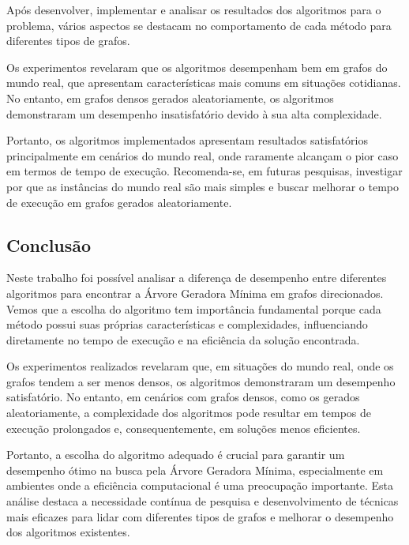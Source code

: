 Após desenvolver, implementar e analisar os resultados dos algoritmos para o problema, vários aspectos se destacam no comportamento de cada método para diferentes tipos de grafos.

Os experimentos revelaram que os algoritmos desempenham bem em grafos do mundo real, que apresentam características mais comuns em situações cotidianas. No entanto, em grafos densos gerados aleatoriamente, os algoritmos demonstraram um desempenho insatisfatório devido à sua alta complexidade.

Portanto, os algoritmos implementados apresentam resultados satisfatórios principalmente em cenários do mundo real, onde raramente alcançam o pior caso em termos de tempo de execução. Recomenda-se, em futuras pesquisas, investigar por que as instâncias do mundo real são mais simples e buscar melhorar o tempo de execução em grafos gerados aleatoriamente.

\subsection{\esp Conclusão}
Neste trabalho foi possível analisar a diferença de desempenho entre diferentes algoritmos para encontrar a Árvore Geradora Mínima em grafos direcionados. Vemos que a escolha do algoritmo tem importância fundamental porque cada método possui suas próprias características e complexidades, influenciando diretamente no tempo de execução e na eficiência da solução encontrada.

Os experimentos realizados revelaram que, em situações do mundo real, onde os grafos tendem a ser menos densos, os algoritmos demonstraram um desempenho satisfatório. No entanto, em cenários com grafos densos, como os gerados aleatoriamente, a complexidade dos algoritmos pode resultar em tempos de execução prolongados e, consequentemente, em soluções menos eficientes.

Portanto, a escolha do algoritmo adequado é crucial para garantir um desempenho ótimo na busca pela Árvore Geradora Mínima, especialmente em ambientes onde a eficiência computacional é uma preocupação importante. Esta análise destaca a necessidade contínua de pesquisa e desenvolvimento de técnicas mais eficazes para lidar com diferentes tipos de grafos e melhorar o desempenho dos algoritmos existentes.

% 
